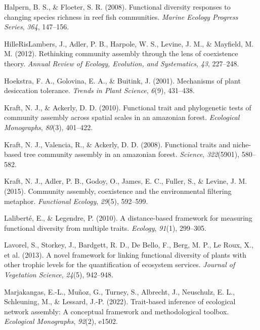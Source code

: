 \documentclass[
]{agujournal2019}
\newlength{\cslhangindent}
\newenvironment{CSLReferences}[2] %
 {\begin{list}{}{%
  \setlength{\itemindent}{0pt}
  \setlength{\leftmargin}{0pt}
  \setlength{\parsep}{0pt}
  \ifodd #1
   \setlength{\leftmargin}{\cslhangindent}
   \setlength{\itemindent}{-1\cslhangindent}
  \fi
  \setlength{\itemsep}{#2\baselineskip}}}
 {\end{list}}
\begin{document}
\begin{CSLReferences}{1}{0}
Halpern, B. S., \& Floeter, S. R. (2008). Functional diversity responses
to changing species richness in reef fish communities. \emph{Marine
Ecology Progress Series}, \emph{364}, 147--156.

HilleRisLambers, J., Adler, P. B., Harpole, W. S., Levine, J. M., \&
Mayfield, M. M. (2012). Rethinking community assembly through the lens
of coexistence theory. \emph{Annual Review of Ecology, Evolution, and
Systematics}, \emph{43}, 227--248.

Hoekstra, F. A., Golovina, E. A., \& Buitink, J. (2001). Mechanisms of
plant desiccation tolerance. \emph{Trends in Plant Science},
\emph{6}(9), 431--438.

Kraft, N. J., \& Ackerly, D. D. (2010). Functional trait and
phylogenetic tests of community assembly across spatial scales in an
amazonian forest. \emph{Ecological Monographs}, \emph{80}(3), 401--422.

Kraft, N. J., Valencia, R., \& Ackerly, D. D. (2008). Functional traits
and niche-based tree community assembly in an amazonian forest.
\emph{Science}, \emph{322}(5901), 580--582.

Kraft, N. J., Adler, P. B., Godoy, O., James, E. C., Fuller, S., \&
Levine, J. M. (2015). Community assembly, coexistence and the
environmental filtering metaphor. \emph{Functional Ecology},
\emph{29}(5), 592--599.

Laliberté, E., \& Legendre, P. (2010). A distance-based framework for
measuring functional diversity from multiple traits. \emph{Ecology},
\emph{91}(1), 299--305.

Lavorel, S., Storkey, J., Bardgett, R. D., De Bello, F., Berg, M. P., Le
Roux, X., et al. (2013). A novel framework for linking functional
diversity of plants with other trophic levels for the quantification of
ecosystem services. \emph{Journal of Vegetation Science}, \emph{24}(5),
942--948.

Marjakangas, E.-L., Muñoz, G., Turney, S., Albrecht, J., Neuschulz, E.
L., Schleuning, M., \& Lessard, J.-P. (2022). Trait-based inference of
ecological network assembly: A conceptual framework and methodological
toolbox. \emph{Ecological Monographs}, \emph{92}(2), e1502.


\end{CSLReferences}
\end{document}
